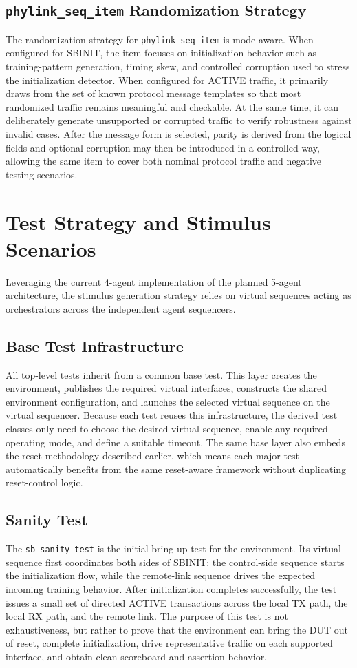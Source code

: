 \subsection{\texttt{phylink\_seq\_item} Randomization Strategy}
The randomization strategy for \texttt{phylink\_seq\_item} is mode-aware. When configured for SBINIT, the item focuses on initialization behavior such as training-pattern generation, timing skew, and controlled corruption used to stress the initialization detector. When configured for ACTIVE traffic, it primarily draws from the set of known protocol message templates so that most randomized traffic remains meaningful and checkable. At the same time, it can deliberately generate unsupported or corrupted traffic to verify robustness against invalid cases. After the message form is selected, parity is derived from the logical fields and optional corruption may then be introduced in a controlled way, allowing the same item to cover both nominal protocol traffic and negative testing scenarios.

\section{Test Strategy and Stimulus Scenarios}
Leveraging the current 4-agent implementation of the planned 5-agent architecture, the stimulus generation strategy relies on virtual sequences acting as orchestrators across the independent agent sequencers.

\subsection{Base Test Infrastructure}
All top-level tests inherit from a common base test. This layer creates the environment, publishes the required virtual interfaces, constructs the shared environment configuration, and launches the selected virtual sequence on the virtual sequencer. Because each test reuses this infrastructure, the derived test classes only need to choose the desired virtual sequence, enable any required operating mode, and define a suitable timeout. The same base layer also embeds the reset methodology described earlier, which means each major test automatically benefits from the same reset-aware framework without duplicating reset-control logic.

\subsection{Sanity Test}
The \texttt{sb\_sanity\_test} is the initial bring-up test for the environment. Its virtual sequence first coordinates both sides of SBINIT: the control-side sequence starts the initialization flow, while the remote-link sequence drives the expected incoming training behavior. After initialization completes successfully, the test issues a small set of directed ACTIVE transactions across the local TX path, the local RX path, and the remote link. The purpose of this test is not exhaustiveness, but rather to prove that the environment can bring the DUT out of reset, complete initialization, drive representative traffic on each supported interface, and obtain clean scoreboard and assertion behavior.

